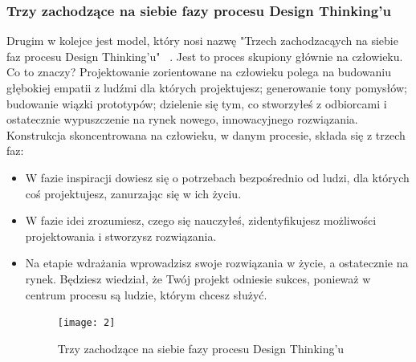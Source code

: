 \documentclass[a4paper,titleauthor]{mwart}
\begin{document}
	
	\subsubsection{Trzy zachodzące na siebie fazy procesu Design Thinking'u}
	
	Drugim w kolejce jest model, który nosi nazwę "Trzech zachodzacąych na siebie faz procesu Design Thinking'u" ~\cite{Proces2}. Jest to proces skupiony głównie na człowieku. \newline \newline 
	Co to znaczy? \newline \newline
	Projektowanie zorientowane na człowieku polega na budowaniu głębokiej empatii z ludźmi dla których projektujesz; generowanie tony pomysłów; budowanie wiązki prototypów; dzielenie się tym, co stworzyłeś z odbiorcami i ostatecznie wypuszczenie na rynek nowego, innowacyjnego rozwiązania. \newline \newline
	Konstrukcja skoncentrowana na człowieku, w danym procesie, składa się z trzech faz:\newline
	\begin{itemize}
		\item W fazie inspiracji dowiesz się o potrzebach bezpośrednio od ludzi, dla których coś projektujesz, zanurzając się w ich życiu. 
		\item W fazie idei zrozumiesz, czego się nauczyłeś, zidentyfikujesz możliwości projektowania i stworzysz rozwiązania. 
		\item Na etapie wdrażania wprowadzisz swoje rozwiązania w życie, a ostatecznie na rynek. Będziesz wiedział, że Twój projekt odniesie sukces, ponieważ w centrum procesu są ludzie, którym chcesz służyć. \newline \newline
		
		\begin{figure}[h]
			\centering
			\texttt{[image: 2]}
			\caption{Trzy zachodzące na siebie fazy procesu Design Thinking'u}
		\end{figure}
		
	\end{itemize}
	
	
\end{document}
